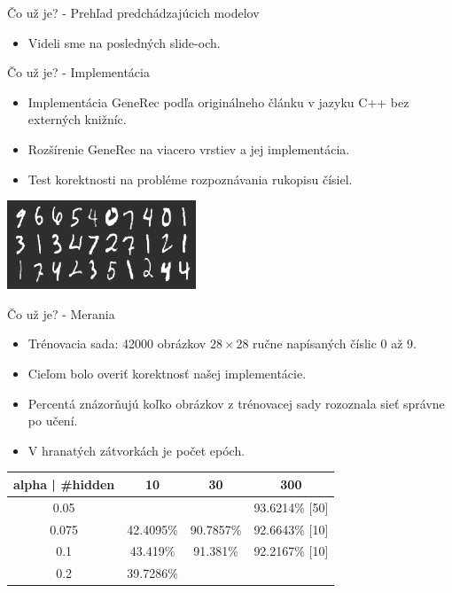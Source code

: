 \documentclass[xcolor=dvipsnames]{beamer}
\begin{document}
\begin{frame}{Čo už je? - Prehľad predchádzajúcich modelov}
  \begin{itemize}
    \item Videli sme na posledných slide-och. 
  \end{itemize}
\end{frame}

\begin{frame}{Čo už je? - Implementácia}
  \begin{itemize}
    \item Implementácia GeneRec podľa originálneho článku v jazyku C++ bez externých knižníc. 
    \item Rozšírenie GeneRec na viacero vrstiev a jej implementácia. 
    \item Test korektnosti na probléme rozpoznávania rukopisu čísiel. 
  \end{itemize}
  \begin{center}
  \includegraphics[scale=1.0]{img/digits.png}
  \end{center}
\end{frame}

\begin{frame}{Čo už je? - Merania}
  \begin{itemize}
    \item Trénovacia sada: 42000 obrázkov $28 \times 28$ ručne napísaných číslic 0 až 9.  
    \item Cieľom bolo overiť korektnosť našej implementácie. 
    \item Percentá znázorňujú koľko obrázkov z trénovacej sady rozoznala sieť správne po učení. 
    \item V hranatých zátvorkách je počet epóch. 
  \end{itemize} 

  \begin{tabular}{|c|c|c|c|}
    \hline
    alpha | \#hidden & 10 & 30 & 300 \\
    \hline
    0.05 & & & 93.6214\% [50] \\
    \hline
    0.075 & 42.4095\% & 90.7857\% & 92.6643\% [10] \\
    \hline
    0.1 & 43.419\% & 91.381\% & 92.2167\% [10] \\
    \hline
    0.2 & 39.7286\% & & \\
    \hline
  \end{tabular}
\end{frame}
\end{document}

